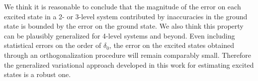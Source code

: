 \documentclass[aps,10pt,superscriptaddress,floatfix,nofootinbib,notitlepage]{revtex4-1}
\begin{document}
We think it is reasonable to conclude that the magnitude of the error on each excited state in a 2- or 3-level system contributed by inaccuracies in the ground state is bounded by the error on the ground state. We also think this property can be plausibly generalized for 4-level systems and beyond. Even including statistical errors on the order of $\delta_0$, the error on the excited states obtained through an orthogonalization procedure will remain comparably small. Therefore the generalized variational approach developed in this work for estimating excited states is a robust one. 




















%

\end{document}
